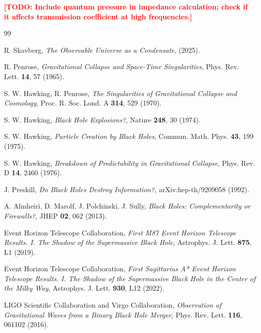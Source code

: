 \documentclass[12pt,a4paper]{article}
\newcommand{\TODO}[1]{\textcolor{red}{\textbf{[TODO: #1]}}}
\theoremstyle{definition}
\begin{document}
\TODO{Include quantum pressure in impedance calculation; check if it affects transmission coefficient at high frequencies.}


\begin{thebibliography}{99}

R. Skavberg, \textit{The Observable Universe as a Condensate}, (2025).

R. Penrose, \textit{Gravitational Collapse and Space-Time Singularities}, Phys. Rev. Lett. \textbf{14}, 57 (1965).

S. W. Hawking, R. Penrose, \textit{The Singularities of Gravitational Collapse and Cosmology}, Proc. R. Soc. Lond. A \textbf{314}, 529 (1970).

S. W. Hawking, \textit{Black Hole Explosions?}, Nature \textbf{248}, 30 (1974).

S. W. Hawking, \textit{Particle Creation by Black Holes}, Commun. Math. Phys. \textbf{43}, 199 (1975).

S. W. Hawking, \textit{Breakdown of Predictability in Gravitational Collapse}, Phys. Rev. D \textbf{14}, 2460 (1976).

J. Preskill, \textit{Do Black Holes Destroy Information?}, arXiv:hep-th/9209058 (1992).

A. Almheiri, D. Marolf, J. Polchinski, J. Sully, \textit{Black Holes: Complementarity or Firewalls?}, JHEP \textbf{02}, 062 (2013).

Event Horizon Telescope Collaboration, \textit{First M87 Event Horizon Telescope Results. I. The Shadow of the Supermassive Black Hole}, Astrophys. J. Lett. \textbf{875}, L1 (2019).

Event Horizon Telescope Collaboration, \textit{First Sagittarius A* Event Horizon Telescope Results. I. The Shadow of the Supermassive Black Hole in the Center of the Milky Way}, Astrophys. J. Lett. \textbf{930}, L12 (2022).

LIGO Scientific Collaboration and Virgo Collaboration, \textit{Observation of Gravitational Waves from a Binary Black Hole Merger}, Phys. Rev. Lett. \textbf{116}, 061102 (2016).


\end{thebibliography}
\end{document}
